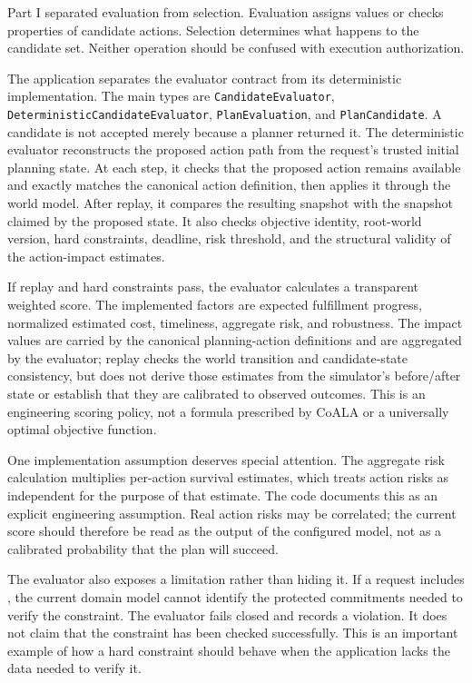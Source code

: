 Part I separated evaluation from selection. Evaluation assigns values or checks properties of candidate actions. Selection determines what happens to the candidate set. Neither operation should be confused with execution authorization.

The application separates the evaluator contract from its deterministic implementation. The main types are \texttt{CandidateEvaluator}, \texttt{DeterministicCandidate\allowbreak Evaluator}, \texttt{PlanEvaluation}, and \texttt{PlanCandidate}. A candidate is not accepted merely because a planner returned it. The deterministic evaluator reconstructs the proposed action path from the request's trusted initial planning state. At each step, it checks that the proposed action remains available and exactly matches the canonical action definition, then applies it through the world model. After replay, it compares the resulting snapshot with the snapshot claimed by the proposed state. It also checks objective identity, root-world version, hard constraints, deadline, risk threshold, and the structural validity of the action-impact estimates.

If replay and hard constraints pass, the evaluator calculates a transparent weighted score. The implemented factors are expected fulfillment progress, normalized estimated cost, timeliness, aggregate risk, and robustness. The impact values are carried by the canonical planning-action definitions and are aggregated by the evaluator; replay checks the world transition and candidate-state consistency, but does not derive those estimates from the simulator's before/after state or establish that they are calibrated to observed outcomes. This is an engineering scoring policy, not a formula prescribed by CoALA or a universally optimal objective function.

One implementation assumption deserves special attention. The aggregate risk calculation multiplies per-action survival estimates, which treats action risks as independent for the purpose of that estimate. The code documents this as an explicit engineering assumption. Real action risks may be correlated; the current score should therefore be read as the output of the configured model, not as a calibrated probability that the plan will succeed.

The evaluator also exposes a limitation rather than hiding it. If a request includes , the current domain model cannot identify the protected commitments needed to verify the constraint. The evaluator fails closed and records a violation. It does not claim that the constraint has been checked successfully. This is an important example of how a hard constraint should behave when the application lacks the data needed to verify it.

